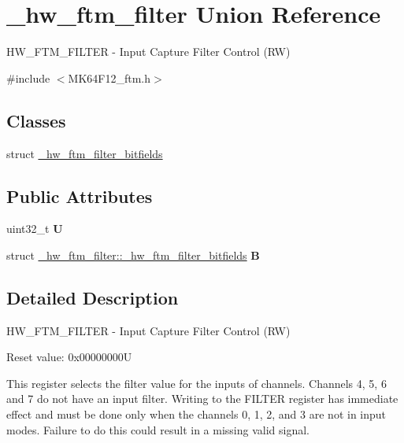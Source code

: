 \hypertarget{union__hw__ftm__filter}{}\section{\+\_\+hw\+\_\+ftm\+\_\+filter Union Reference}
\label{union__hw__ftm__filter}


H\+W\+\_\+\+F\+T\+M\+\_\+\+F\+I\+L\+T\+ER -\/ Input Capture Filter Control (RW)  




{\ttfamily \#include $<$M\+K64\+F12\+\_\+ftm.\+h$>$}

\subsection*{Classes}
\begin{DoxyCompactItemize}
\item 
struct \hyperlink{struct__hw__ftm__filter_1_1__hw__ftm__filter__bitfields}{\+\_\+hw\+\_\+ftm\+\_\+filter\+\_\+bitfields}
\end{DoxyCompactItemize}
\subsection*{Public Attributes}
\begin{DoxyCompactItemize}
\item 
uint32\+\_\+t {\bfseries U}\hypertarget{union__hw__ftm__filter_a989b612058bd3297153cb76243858fa4}{}\label{union__hw__ftm__filter_a989b612058bd3297153cb76243858fa4}

\item 
struct \hyperlink{struct__hw__ftm__filter_1_1__hw__ftm__filter__bitfields}{\+\_\+hw\+\_\+ftm\+\_\+filter\+::\+\_\+hw\+\_\+ftm\+\_\+filter\+\_\+bitfields} {\bfseries B}\hypertarget{union__hw__ftm__filter_a1c4d840155792ecd5486d6a958670109}{}\label{union__hw__ftm__filter_a1c4d840155792ecd5486d6a958670109}

\end{DoxyCompactItemize}


\subsection{Detailed Description}
H\+W\+\_\+\+F\+T\+M\+\_\+\+F\+I\+L\+T\+ER -\/ Input Capture Filter Control (RW) 

Reset value\+: 0x00000000U

This register selects the filter value for the inputs of channels. Channels 4, 5, 6 and 7 do not have an input filter. Writing to the F\+I\+L\+T\+ER register has immediate effect and must be done only when the channels 0, 1, 2, and 3 are not in input modes. Failure to do this could result in a missing valid signal. 


